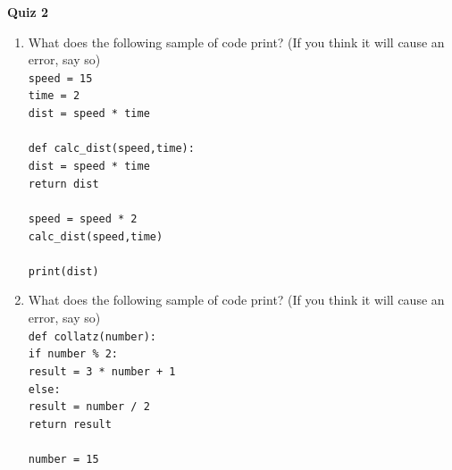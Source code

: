 \documentclass{article}
\begin{document}
\fancyfoot[C]{\thepage}
\vspace*{0cm}
\begin{center}
	{\LARGE \textbf{Quiz 2}}\\
	\vspace{.25cm}
\end{center}

\begin{enumerate}
	\item What does the following sample of code print? (If you think it will cause an error, say so)\\ \texttt{speed = 15}\\
	\texttt{time = 2}\\
	\texttt{dist = speed * time}\\
	\texttt{}\\
	\texttt{def calc\_dist(speed,time):}\\
	\null\quad\quad\texttt{dist = speed * time}\\
	\null\quad\quad\texttt{return dist}\\
	\texttt{}\\
	\texttt{speed = speed * 2}\\
	\texttt{calc\_dist(speed,time)}\\
	\texttt{}\\
	\texttt{print(dist)}\\
	\item What does the following sample of code print? (If you think it will cause an error, say so)\\ 
\texttt{def collatz(number):}\\
\null\quad\quad\texttt{if number \% 2:}\\
	\null\quad\quad\quad\quad\texttt{result = 3 * number + 1}\\
	\null\quad\quad\texttt{else:}\\
	\null\quad\quad\quad\quad\texttt{result = number / 2}\\
	\null\quad\quad\texttt{return result}\\
	\null\quad\quad\quad\quad\texttt{}\\
	\texttt{number = 15}\\

\end{enumerate}
\end{document}
